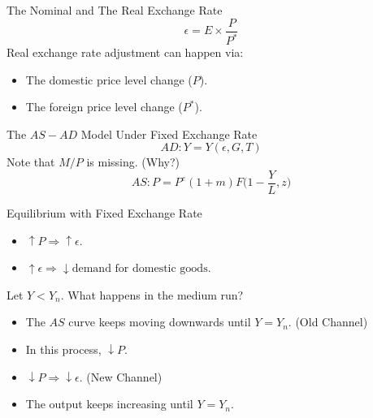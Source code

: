 \documentclass[shownotes,11pt, aspectratio=169]{beamer}
\begin{document}
\begin{frame}{The Nominal and The Real Exchange Rate}
\[ \epsilon = E\times\frac{P}{P^{\ast}} \]
Real exchange rate adjustment can happen via:
\begin{itemize}
\item The domestic price level change ($P$).
\item The foreign price level change ($P^{\ast}$).
\end{itemize}
\end{frame}

\begin{frame}{The $AS-AD$ Model Under Fixed Exchange Rate}
\begin{equation*}
AD: Y = Y(\epsilon, G, T)
\end{equation*}
Note that $M/P$ is missing. (Why?)
\pause
\begin{equation*}
AS: P = P^e(1 + m)F\Bigg(1 - \frac{Y}{L}, z\Bigg)
\end{equation*}
\end{frame}

\begin{frame}{Equilibrium with Fixed Exchange Rate}
\begin{itemize}
\item $\uparrow P \Rightarrow \uparrow \epsilon $.
\item $\uparrow \epsilon \Rightarrow \downarrow \text{demand for domestic goods}$.
\end{itemize}
Let $Y < Y_n$. What happens in the medium run?
\begin{itemize}
\item The $AS$ curve keeps moving downwards until $Y = Y_n$. (Old Channel)
\item In this process, $\downarrow P$.
\item $\downarrow P \Rightarrow \downarrow \epsilon$. (New Channel)
\item The output keeps increasing until $Y = Y_n$.
\end{itemize}
\end{frame}
\end{document}
